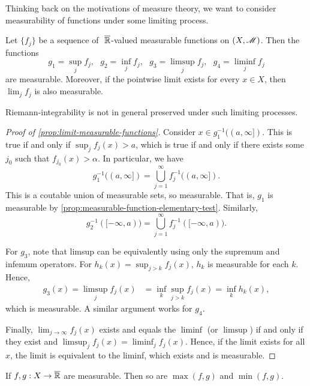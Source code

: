 \documentclass[12pt]{article} %
\begin{document}
Thinking back on the motivations of measure theory, we want to consider measurability of functions under some limiting process. 

\begin{proposition}\label{prop:limit-measurable-functions}
    Let $\{f_j\}$ be a sequence of $\ \overline{\mathbb{R}}$-valued measurable functions on $(X, \mathscr{M})$. Then the functions \[g_1 = \sup_j f_j, \ \ \ g_2 = \inf_j f_j, \ \ \ g_3 = \limsup_j f_j, \ \ \ g_4 = \liminf_j f_j\] are measurable. Moreover, if the pointwise limit exists for every $x \in X$, then $\lim_j f_j$ is also measurable.
\end{proposition}

\begin{remark}
    Riemann-integrability is not in general preserved under such limiting processes. 
\end{remark}

\begin{proof}[Proof of \cref{prop:limit-measurable-functions}]
    Consider $x \in g_1^{-1}((a, \infty])$. This is true if and only if $\sup_j f_j(x) > a$, which is true if and only if there exists some $j_0$ such that $f_{j_0}(x) > \alpha$. In particular, we have \[g_1^{-1}((a, \infty]) = \bigcup_{j=1}^{\infty} f_j^{-1}((a, \infty]).\] This is a coutable union of measurable sets, so measurable. That is, $g_1$ is measurable by \cref{prop:measurable-function-elementary-test}. Similarly, \[g_2^{-1}([-\infty, a)) = \bigcup_{j=1}^{\infty} f_j^{-1}([-\infty, a)).\]

    For $g_3$, note that limsup can be equivalently using only the supremum and infemum operators. For $h_k(x) = \sup_{j > k} f_j(x)$, $h_k$ is measurable for each $k$. Hence, \begin{align*}
        g_3(x) = \limsup_{j} f_j(x) &= \inf_k \sup_{j > k} f_j(x) = \inf_k h_k(x),
    \end{align*} which is measurable. A similar argument works for $g_4$.

    Finally, $\lim_{j \to \infty} f_j(x)$ exists and equals the $\liminf$ (or $\limsup$) if and only if they exist and $\limsup_j f_j(x) = \liminf_j f_j(x)$. Hence, if the limit exists for all $x$, the limit is equivalent to the liminf, which exists and is measurable.
\end{proof}

\begin{corollary}
    If $f, g : X \to \overline{\mathbb{R}}$ are measurable. Then so are $\max(f, g)$ and $\min(f, g)$.
\end{corollary}
\end{document}
